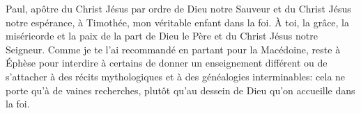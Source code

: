 Paul, apôtre du Christ Jésus
	par ordre de Dieu notre Sauveur et du Christ Jésus notre espérance,
	à Timothée, mon véritable enfant dans la foi.
À toi, la grâce, la miséricorde et la paix
	de la part de Dieu le Père et du Christ Jésus notre Seigneur.
Comme je te l’ai recommandé en partant pour la Macédoine,
	reste à Éphèse pour interdire à certains de donner un enseignement différent
	ou de s’attacher à des récits mythologiques et à des généalogies interminables:
	cela ne porte qu’à de vaines recherches,
	plutôt qu’au dessein de Dieu qu’on accueille dans la foi.
